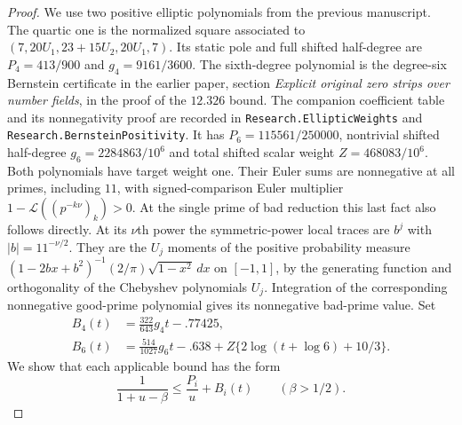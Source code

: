 \documentclass[11pt]{article}
\begin{document}
\begin{proof}
We use two positive elliptic polynomials from the previous manuscript. The quartic one is the normalized square associated to $(7,20U_1,23+15U_2,20U_1,7)$. Its static pole and full shifted half-degree are $P_4=413/900$ and $g_4=9161/3600$. The sixth-degree polynomial is the degree-six Bernstein certificate in the earlier paper, section \emph{Explicit original zero strips over number fields}, in the proof of the $12.326$ bound. The companion coefficient table and its nonnegativity proof are recorded in \texttt{Research.EllipticWeights} and \texttt{Research.BernsteinPositivity}. It has $P_6=115561/250000$, nontrivial shifted half-degree $g_6=2284863/10^6$ and total shifted scalar weight $Z=468083/10^6$. Both polynomials have target weight one. Their Euler sums are nonnegative at all primes, including $11$, with signed-comparison Euler multiplier $1-\mathcal L((p^{-k\nu})_k)>0$. At the single prime of bad reduction this last fact also follows directly. At its $\nu$th power the symmetric-power local traces are $b^j$ with $|b|=11^{-\nu/2}$. They are the $U_j$ moments of the positive probability measure $(1-2bx+b^2)^{-1}(2/\pi)\sqrt{1-x^2}\,dx$ on $[-1,1]$, by the generating function and orthogonality of the Chebyshev polynomials $U_j$. Integration of the corresponding nonnegative good-prime polynomial gives its nonnegative bad-prime value. Set
\begin{align*}
 B_4(t)&=\frac{322}{643}g_4t-.77425,\\
 B_6(t)&=\frac{514}{1027}g_6t-.638+Z\{2\log(t+\log 6)+10/3\}.
\end{align*}
We show that each applicable bound has the form
\[
     \frac1{1+u-\beta}\le \frac{P_i}u+B_i(t)
           \qquad(\beta>1/2).
\]


\end{proof}
\end{document}
